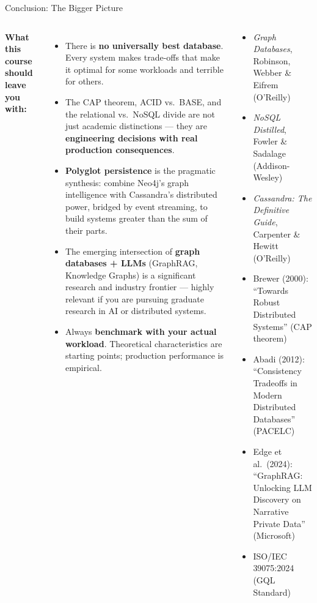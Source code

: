 \documentclass[aspectratio=169]{beamer}
\begin{document}
\begin{frame}{Conclusion: The Bigger Picture}
  \begin{columns}[T]
      \small
      \textbf{What this course should leave you with:}
      \begin{itemize}
        \item There is \textbf{no universally best database}. Every system makes trade-offs that make it optimal for some workloads and terrible for others.
        \item The CAP theorem, ACID vs.\ BASE, and the relational vs.\ NoSQL divide are not just academic distinctions — they are \textbf{engineering decisions with real production consequences}.
        \item \textbf{Polyglot persistence} is the pragmatic synthesis: combine Neo4j's graph intelligence with Cassandra's distributed power, bridged by event streaming, to build systems greater than the sum of their parts.
        \item The emerging intersection of \textbf{graph databases + LLMs} (GraphRAG, Knowledge Graphs) is a significant research and industry frontier — highly relevant if you are pursuing graduate research in AI or distributed systems.
        \item Always \textbf{benchmark with your actual workload}. Theoretical characteristics are starting points; production performance is empirical.
      \end{itemize}
      \begin{tcolorbox}[infobox, title=Further Reading]
        \scriptsize
        \begin{itemize}
          \item \textit{Graph Databases}, Robinson, Webber \& Eifrem (O'Reilly)
          \item \textit{NoSQL Distilled}, Fowler \& Sadalage (Addison-Wesley)
          \item \textit{Cassandra: The Definitive Guide}, Carpenter \& Hewitt (O'Reilly)
          \item Brewer (2000): ``Towards Robust Distributed Systems'' (CAP theorem)
          \item Abadi (2012): ``Consistency Tradeoffs in Modern Distributed Databases'' (PACELC)
          \item Edge et al.\ (2024): ``GraphRAG: Unlocking LLM Discovery on Narrative Private Data'' (Microsoft)
          \item ISO/IEC 39075:2024 (GQL Standard)
        \end{itemize}
      \end{tcolorbox}
  \end{columns}
\end{frame}
\end{document}
